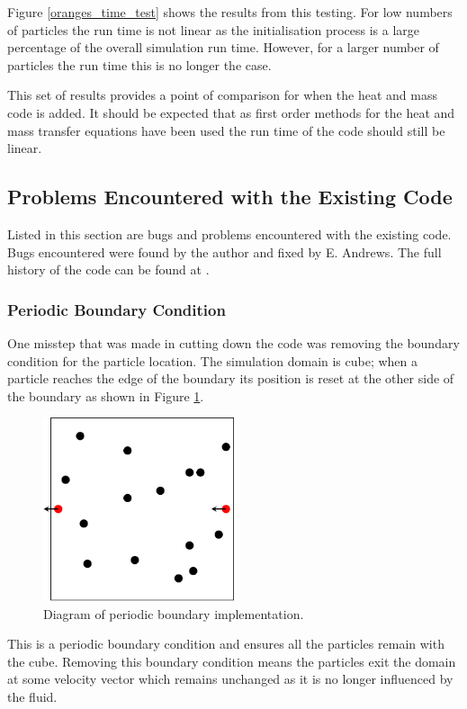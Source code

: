 \documentclass[../Interim_Report_Master]{subfiles}
\begin{document}
Figure \ref{oranges_time_test} shows the results from this testing. For low numbers of particles the run time is not linear as the initialisation process is a large percentage of the overall simulation run time. However, for a larger number of particles the run time this is no longer the case. 

This set of results provides a point of comparison for when the heat and mass code is added. It should be expected that as first order methods for the heat and mass transfer equations have been used the run time of the code should still be linear. 

\subsection{Problems Encountered with the Existing Code}
Listed in this section are bugs and problems encountered with the existing code. Bugs encountered were found by the author and fixed by E. Andrews. The full history of the code can be found at \cite{andrews2020}.

\subsubsection{Periodic Boundary Condition}
One misstep that was made in cutting down the code was removing the boundary condition for the particle location. The simulation domain is cube; when a particle reaches the edge of the boundary its position is reset at the other side of the boundary as shown in Figure \ref{periodic_boundary}.
\begin{figure}
	\centering
	\includegraphics[width=0.5\textwidth]{./Diagrams/Periodic_Boundary/Periodic_Boundary.pdf}
	\caption{Diagram of periodic boundary implementation.}
	\label{periodic_boundary}
\end{figure}

This is a periodic boundary condition and ensures all the particles remain with the cube. Removing this boundary condition means the particles exit the domain at some velocity vector which remains unchanged as it is no longer influenced by the fluid. 
\end{document}
